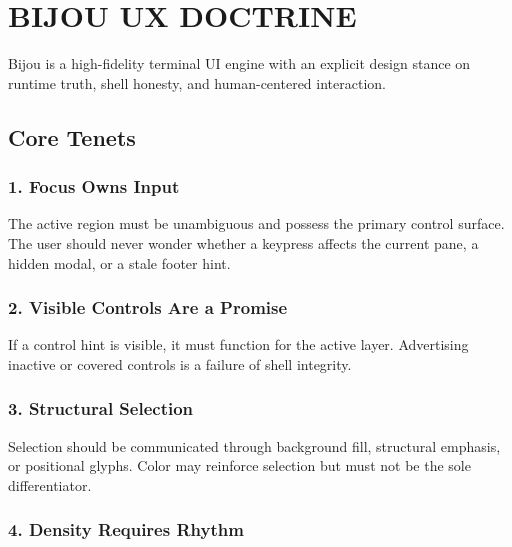 \chapter{BIJOU UX DOCTRINE}\label{record-034}

\smallskip

Bijou is a high-fidelity terminal UI engine with an explicit design stance on runtime truth, shell honesty, and human-centered interaction.

\section{Core Tenets}\label{record-034-core-tenets}

\subsection{1. Focus Owns Input}\label{record-034-focus-owns-input}

The active region must be unambiguous and possess the primary control surface. The user should never wonder whether a keypress affects the current pane, a hidden modal, or a stale footer hint.

\subsection{2. Visible Controls Are a Promise}\label{record-034-visible-controls-are-a-promise}

If a control hint is visible, it must function for the active layer. Advertising inactive or covered controls is a failure of shell integrity.

\subsection{3. Structural Selection}\label{record-034-structural-selection}

Selection should be communicated through background fill, structural emphasis, or positional glyphs. Color may reinforce selection but must not be the sole differentiator.

\subsection{4. Density Requires Rhythm}\label{record-034-density-requires-rhythm}


